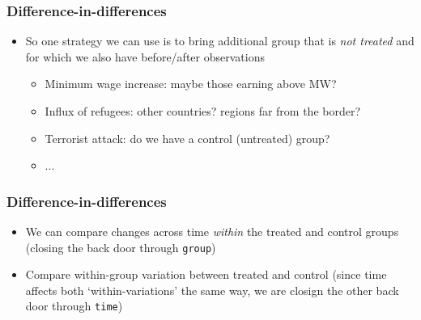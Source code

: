 \documentclass[aspectratio=43]{beamer}
\begin{document}
\begin{frame}
\frametitle{Difference-in-differences}
\centering

\begin{itemize}
  \item So one strategy we can use is to bring additional group that is \textit{not treated} and for which we also have before/after observations
  \begin{itemize}
    \item Minimum wage increase: maybe those earning above MW?
    \item Influx of refugees: other countries? regions far from the border?
    \item Terrorist attack: do we have a control (untreated) group?
    \item ...
  \end{itemize}
\end{itemize}


\end{frame}

\begin{frame}
\frametitle{Difference-in-differences}
\centering


\begin{itemize}
  \item We can compare changes across time \textit{within} the treated and control groups (closing the back door through \texttt{group})
  \item Compare within-group variation between treated and control (since time affects both `within-variations' the same way, we are closign the other back door through \texttt{time})
\end{itemize}

\end{frame}
\end{document}
